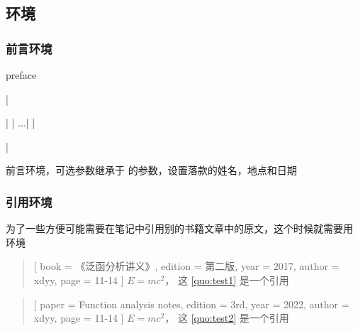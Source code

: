 \documentclass{xdyy-usermanual}
\begin{document}



\subsection{环境}

\subsubsection{ 前言环境  }
\begin{function}[added = 2022-02-17]{preface}
  \begin{syntax}
    |\begin{preface}[signature = {name = ..., place = ..., date = ...}]|
      |  ...|
    |\end{preface}|
  \end{syntax}
  前言环境，可选参数继承于  的参数，设置落款的姓名，地点和日期
\end{function}



\subsubsection{ 引用环境  }

为了一些方便可能需要在笔记中引用别的书籍文章中的原文，这个时候就需要用  环境

\begin{vexample}
    \begin{quotation}[
      book    = {《泛函分析讲义》},      %
      edition = {第二版},                %
      year    = {2017},                  %
      author  = {xdyy},                  %
      page    = {11-14}                  %
    ]\label{quo:test1}
      $E = m c^2$， 这 \ref{quo:test1} 是一个引用
    \end{quotation}
\end{vexample}

\begin{vexample}
    \begin{quotation}[
      paper   = {Function analysis notes},   %
      edition = {3rd},                       %
      year    = {2022},                      %
      author  = {xdyy},                      %
      page    = {11-14}                      %
    ]\label{quo:test2}
      $E = m c^2$， 这 \ref{quo:test2} 是一个引用
    \end{quotation}
\end{vexample}
\end{document}
